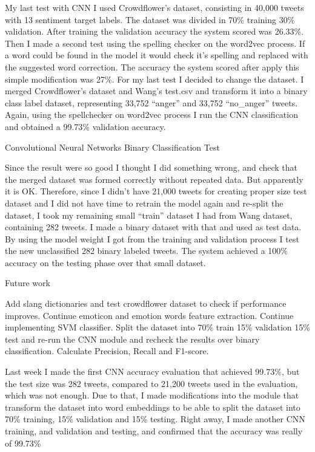 My last test with CNN I used Crowdflower’s dataset, consisting in 40,000 tweets with 13 sentiment target labels. The dataset was divided in 70\% training 30\% validation. After training the validation accuracy the system scored was 26.33\%. Then I made a second test using the spelling checker on the word2vec process. If a word could be found in the model it would check it’s spelling and replaced with the suggested word correction. The accuracy the system scored after apply this simple modification was 27\%. For my last test I decided to change the dataset. I merged Crowdflower’s dataset and Wang’s test.csv and transform it into a binary class label dataset, representing 33,752 “anger” and 33,752 “no\_anger” tweets. Again, using the spellchecker on word2vec process I run the CNN classification and obtained a 99.73\% validation accuracy.

Convolutional Neural Networks Binary Classification Test

Since the result were so good I thought I did something wrong, and check that the merged dataset was formed correctly without repeated data. But apparently it is OK. Therefore, since I didn’t have 21,000 tweets for creating proper size test dataset and I did not have time to retrain the model again and re-split the dataset, I took my remaining small “train” dataset I had from Wang dataset, containing 282 tweets. I made a binary dataset with that and used as test data. By using the model weight I got from the training and validation process I test the new unclassified 282 binary labeled tweets. The system achieved a 100\% accuracy on the testing phase over that small dataset.

Future work

Add slang dictionaries and test crowdflower dataset to check if performance improves.
Continue emoticon and emotion words feature extraction.
Continue implementing SVM classifier.
Split the dataset into 70\% train 15\% validation 15\% test and re-run the CNN module and recheck the results over binary classification.
Calculate Precision, Recall and F1-score.

Last week I made the first CNN accuracy evaluation that achieved 99.73\%, but the test size was 282 tweets, compared to 21,200 tweets used in the evaluation, which was not enough.
Due to that, I made modifications into the module that transform the dataset into word embeddings to be able to split the dataset into 70\% training, 15\% validation and 15\% testing.
Right away, I made another CNN training, and validation and testing, and confirmed that the accuracy was really of 99.73\%

